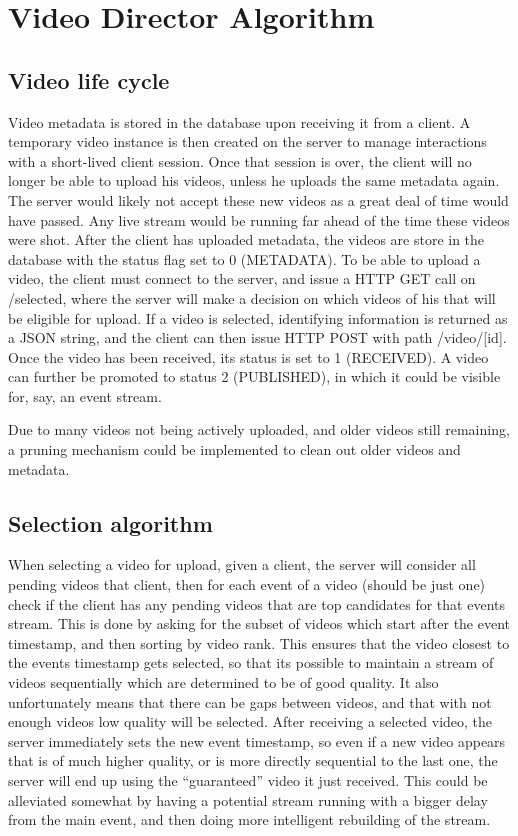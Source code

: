 \documentclass[conference]{IEEEtran}
\begin{document}
\section{Video Director Algorithm}

\subsection{Video life cycle}

Video metadata is stored in the database upon receiving it from a client. A temporary video instance
is then created on the server to manage interactions with a short-lived client session. Once that session
is over, the client will no longer be able to upload his videos, unless he uploads the same metadata again.
The server would likely not accept these new videos as a great deal of time would have passed. Any live stream
would be running far ahead of the time these videos were shot. After the client has uploaded metadata, the
videos are store in the database with the status flag set to 0 (METADATA). To be able to upload a video,
the client must connect to the server, and issue a HTTP GET call on /selected, where the server will make
a decision on which videos of his that will be eligible for upload. If a video is selected, identifying
information is returned as a JSON string, and the client can then issue HTTP POST with path /video/[id].
Once the video has been received, its status is set to 1 (RECEIVED). A video can further be promoted to
status 2 (PUBLISHED), in which it could be visible for, say, an event stream.

Due to many videos not being actively uploaded, and older videos still remaining, a pruning mechanism could
be implemented to clean out older videos and metadata.

\subsection{Selection algorithm}

When selecting a video for upload, given a client, the server will consider all pending videos that client,
then for each event of a video (should be just one) check if the client has any pending videos that
are top candidates for that events stream. This is done by asking for the subset of videos which start after
the event timestamp, and then sorting by video rank. This ensures that the video closest to the events
timestamp gets selected, so that its possible to maintain a stream of videos sequentially which are determined
to be of good quality. It also unfortunately means that there can be gaps between videos, and that with not
enough videos low quality will be selected. After receiving a selected video, the server immediately sets the
new event timestamp, so even if a new video appears that is of much higher quality, or is more directly
sequential to the last one, the server will end up using the ``guaranteed'' video it just received. This could
be alleviated somewhat by having a potential stream running with a bigger delay from the main event, and then
doing more intelligent rebuilding of the stream.
\end{document}
